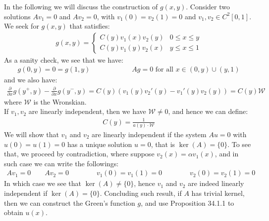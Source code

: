 \documentclass[11pt]{book}
\theoremstyle{break}
\theoremstyle{break}
\newcommand{\pd}{\partial}
\begin{document}
In the following we will discuss the construction of $g(x,y)$. Consider two solutions $Av_1 = 0$ and $Av_2 = 0$, with $v_1(0) = v_2(1) = 0$ and $v_1,v_2 \in C^2[0,1]$. We seek for $g(x,y)$ that satisfies:
\begin{align*}
g(x,y) = \begin{cases} C(y) v_1(x) v_2(y) & 0\leq x\leq y\\
C(y) v_1(y) v_2(x) & y\leq x \leq 1
\end{cases}
\end{align*} 
As a sanity check, we see that we have:
\begin{align*}
g(0,y) = 0 = g(1,y)\qquad\qquad\qquad Ag=0\text{ for all }x\in (0,y) \cup (y,1)
\end{align*}
and we also have:
\begin{align*}
\frac{\pd}{\pd x}g(y^+,y) - \frac{\pd}{\pd x}g(y^-,y) =C(y) \left( v_1(y) v_2'(y) - v_1'(y) v_2(y) \right) = C(y) \mathcal{W}
\end{align*}
where $\mathcal{W}$ is the Wronskian. \\
If $v_1,v_2$ are linearly independent, then we have $\mathcal{W} \neq 0$, and hence we can define:
\begin{align*}
C(y) = \frac{1}{a(y)\cdot \mathcal{W}}
\end{align*} 
We will show that $v_1$ and $v_2$ are linearly independent if the system $Au = 0$ with $u(0) =u(1) = 0$ has a unique solution $u = 0$, that is $\ker(A) = \{0\}$. To see that, we proceed by contradiction, where suppose $v_2(x) = \alpha v_1(x)$, and in such case we can write the followings:
\begin{align*}
Av_1 = 0 \qquad Av_2 = 0  \qquad\qquad v_1(0) = v_1(1) = 0 \qquad\qquad v_2(0)=v_2(1) = 0
\end{align*}
In which case we see that $\ker(A) \neq \{0\}$, hence $v_1$ and $v_2$ are indeed linearly independent if $\ker(A) = \{0\}$. Concluding such result, if $A$ has trivial kernel, then we can construct the Green's function $g$, and use Proposition 34.1.1 to obtain $u(x)$. 
\end{document}
